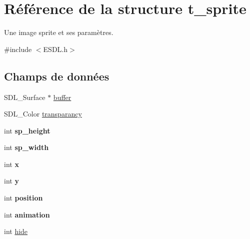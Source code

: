 \hypertarget{structt__sprite}{\section{Référence de la structure t\+\_\+sprite}
\label{structt__sprite}
}


Une image sprite et ses paramètres.  




{\ttfamily \#include $<$E\+S\+D\+L.\+h$>$}

\subsection*{Champs de données}
\begin{DoxyCompactItemize}
\item 
S\+D\+L\+\_\+\+Surface $\ast$ \hyperlink{structt__sprite_a7bf667c8102b5eedf01ce17e1094f62a}{buffer}
\item 
S\+D\+L\+\_\+\+Color \hyperlink{structt__sprite_af47a36836cb7712c252e31161e388ce1}{transparancy}
\item 
\hypertarget{structt__sprite_a104b681bfc30768f7828f2aadbefcb34}{int {\bfseries sp\+\_\+height}}\label{structt__sprite_a104b681bfc30768f7828f2aadbefcb34}

\item 
\hypertarget{structt__sprite_a4b8e33d824d9b6346bcd7b472b9293a8}{int {\bfseries sp\+\_\+width}}\label{structt__sprite_a4b8e33d824d9b6346bcd7b472b9293a8}

\item 
\hypertarget{structt__sprite_a1e6e10c303031cea73d82c28263904b2}{int {\bfseries x}}\label{structt__sprite_a1e6e10c303031cea73d82c28263904b2}

\item 
\hypertarget{structt__sprite_afc6bb977ad1a7bd3b89968d92ca0a063}{int {\bfseries y}}\label{structt__sprite_afc6bb977ad1a7bd3b89968d92ca0a063}

\item 
\hypertarget{structt__sprite_acf8573f733cdf06a8e649f8e70245ee3}{int {\bfseries position}}\label{structt__sprite_acf8573f733cdf06a8e649f8e70245ee3}

\item 
\hypertarget{structt__sprite_af4c71b77cc620e204c9efc36fa9d7ab6}{int {\bfseries animation}}\label{structt__sprite_af4c71b77cc620e204c9efc36fa9d7ab6}

\item 
int \hyperlink{structt__sprite_acac6e6019ee568825e9c30561d555037}{hide}
\end{DoxyCompactItemize}


